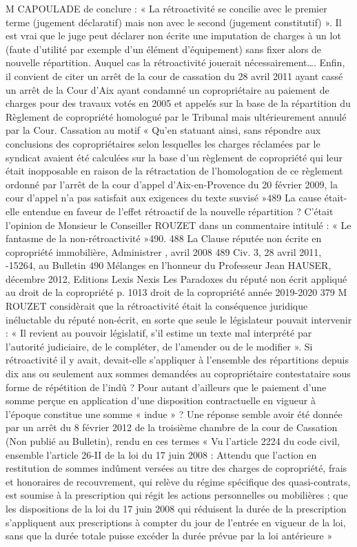 M CAPOULADE de conclure : « La rétroactivité se concilie avec le premier terme (jugement déclaratif) mais non avec le second (jugement constitutif) ».
Il est vrai que le juge peut déclarer non écrite une imputation de charges à un lot (faute d’utilité par exemple d’un élément d’équipement) sans fixer alors de nouvelle répartition. Auquel cas la rétroactivité jouerait nécessairement….
Enfin, il convient de citer un arrêt de la cour de cassation du 28 avril 2011 ayant cassé un arrêt de la Cour d’Aix ayant condamné un copropriétaire au paiement de charges pour des travaux votés en 2005 et appelés sur la base de la répartition du Règlement de copropriété homologué par le Tribunal mais ultérieurement annulé par la Cour. Cassation au motif « Qu'en statuant ainsi, sans répondre aux conclusions des copropriétaires selon lesquelles les charges réclamées par le syndicat avaient été calculées sur la base d'un règlement de copropriété qui leur était inopposable en raison de la rétractation de l'homologation de ce règlement ordonné par l'arrêt de la cour d'appel d'Aix-en-Provence du 20 février 2009, la cour d'appel n'a pas satisfait aux exigences du texte susvisé »489
La cause était-elle entendue en faveur de l’effet rétroactif de la nouvelle répartition ?
C’était l’opinion de Monsieur le Conseiller ROUZET dans un commentaire intitulé : « Le fantasme de la non-rétroactivité »490.
488 La Clause réputée non écrite en copropriété immobilière, Administrer , avril 2008
489 Civ. 3\degres, 28 avril 2011, -15264, au Bulletin
490 Mélanges en l’honneur du Professeur Jean HAUSER, décembre 2012, Editions Lexis Nexis Les Paradoxes du réputé non écrit appliqué au droit de la copropriété p. 1013
droit de la copropriété année 2019-2020
379
M ROUZET considèrait que la rétroactivité était la conséquence juridique inéluctable du réputé non-écrit, en sorte que seule le législateur pouvait intervenir : « Il revient au pouvoir législatif, s’il estime un texte mal interprété par l’autorité judiciaire, de le compléter, de l’amender ou de le modifier ».
Si rétroactivité il y avait, devait-elle s’appliquer à l’ensemble des répartitions depuis dix ans ou seulement aux sommes demandées au copropriétaire contestataire sous forme de répétition de l’indû ? Pour autant d’ailleurs que le paiement d’une somme perçue en application d’une disposition contractuelle en vigueur à l’époque constitue une somme « indue » ?
Une réponse semble avoir été donnée par un arrêt du 8 février 2012 de la troisième chambre de la cour de Cassation (Non publié au Bulletin), rendu en ces termes
« Vu l'article 2224 du code civil, ensemble l'article 26-II de la loi du 17 juin 2008 : Attendu que l'action en restitution de sommes indûment versées au titre des charges de copropriété, frais et honoraires de recouvrement, qui relève du régime spécifique des quasi-contrats, est soumise à la prescription qui régit les actions personnelles ou mobilières ; que les dispositions de la loi du 17 juin 2008 qui réduisent la durée de la prescription s'appliquent aux prescriptions à compter du jour de l'entrée en vigueur de la loi, sans que la durée totale puisse excéder la durée prévue par la loi antérieure »
